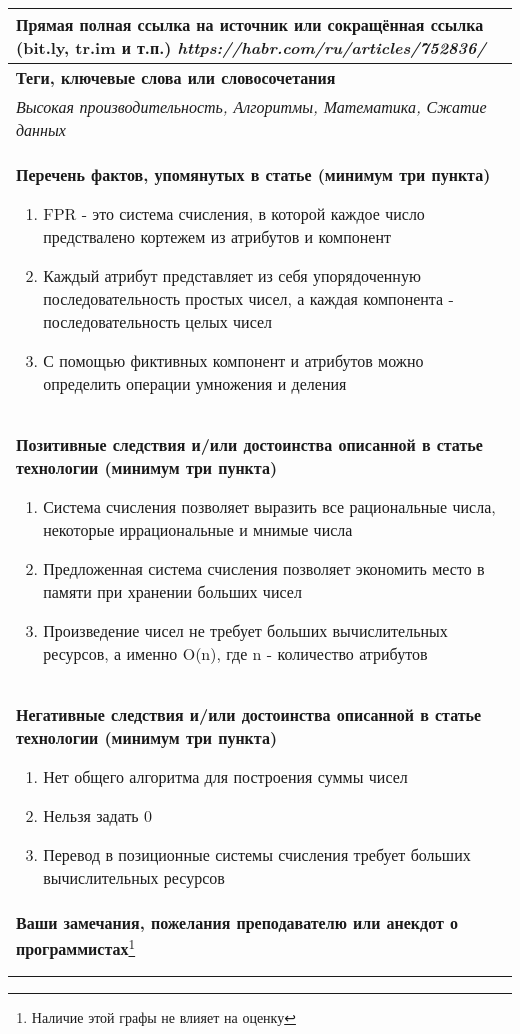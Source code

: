 \documentclass[12pt]{article}
\begin{document}
\begin{tabularx}{\textwidth} { 
  | >{\raggedright\arraybackslash}X|}
    \textbf{Прямая полная ссылка на источник или сокращённая ссылка (bit.ly, tr.im и т.п.)} 
    \textit{https://habr.com/ru/articles/752836/}
    \smallskip\\
    \hline
    \textbf{Теги, ключевые слова или словосочетания}\\
    \textit{Высокая производительность, Алгоритмы, Математика, Сжатие данных}
    \smallskip\\
    \hline
    \textbf{Перечень фактов, упомянутых в статье (минимум три пункта)}
    \begin{enumerate}
    	\item FPR - это система счисления, в которой каждое число предствалено кортежем из атрибутов и компонент
    	\item Каждый атрибут представляет из себя упорядоченную последовательность простых чисел, а каждая компонента - последовательность целых чисел
    	\item С помощью фиктивных компонент и атрибутов можно определить операции умножения и деления
    	
	\end{enumerate}
    \\ \hline
    \textbf{Позитивные следствия и/или достоинства описанной в статье технологии (минимум три пункта)}
    \begin{enumerate}
    	\item  Система счисления позволяет выразить все рациональные числа, некоторые иррациональные и мнимые числа
    	\item Предложенная система счисления позволяет экономить место в памяти при хранении больших чисел
    	\item Произведение чисел не требует больших вычислительных ресурсов, а именно O(n), где n - количество атрибутов
    \end{enumerate}
    \\ \hline
    \textbf{Негативные следствия и/или достоинства описанной в статье технологии (минимум три пункта)}
    \begin{enumerate}
    	\item Нет общего алгоритма для построения суммы чисел
    	\item Нельзя задать 0
    	\item Перевод в позиционные системы счисления требует больших вычислительных ресурсов
    \end{enumerate}
    \\ \hline
    \textbf{Ваши замечания, пожелания преподавателю или анекдот о программистах}\footnote{Наличие этой графы не влияет на оценку}\\
    \bigskip\\
    \bigskip\\
    \hline
    
\end{tabularx}
\end{document}
